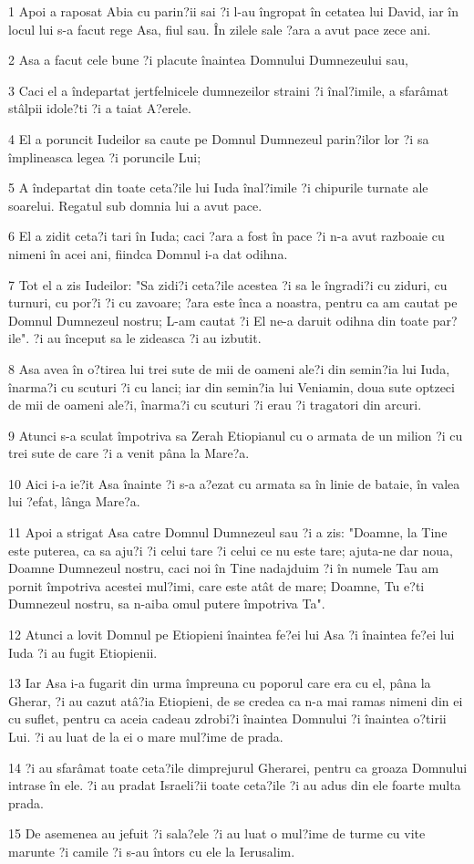 \par 1 Apoi a raposat Abia cu parin?ii sai ?i l-au îngropat în cetatea lui David, iar în locul lui s-a facut rege Asa, fiul sau. În zilele sale ?ara a avut pace zece ani.
\par 2 Asa a facut cele bune ?i placute înaintea Domnului Dumnezeului sau,
\par 3 Caci el a îndepartat jertfelnicele dumnezeilor straini ?i înal?imile, a sfarâmat stâlpii idole?ti ?i a taiat A?erele.
\par 4 El a poruncit Iudeilor sa caute pe Domnul Dumnezeul parin?ilor lor ?i sa împlineasca legea ?i poruncile Lui;
\par 5 A îndepartat din toate ceta?ile lui Iuda înal?imile ?i chipurile turnate ale soarelui. Regatul sub domnia lui a avut pace.
\par 6 El a zidit ceta?i tari în Iuda; caci ?ara a fost în pace ?i n-a avut razboaie cu nimeni în acei ani, fiindca Domnul i-a dat odihna.
\par 7 Tot el a zis Iudeilor: "Sa zidi?i ceta?ile acestea ?i sa le îngradi?i cu ziduri, cu turnuri, cu por?i ?i cu zavoare; ?ara este înca a noastra, pentru ca am cautat pe Domnul Dumnezeul nostru; L-am cautat ?i El ne-a daruit odihna din toate par?ile". ?i au început sa le zideasca ?i au izbutit.
\par 8 Asa avea în o?tirea lui trei sute de mii de oameni ale?i din semin?ia lui Iuda, înarma?i cu scuturi ?i cu lanci; iar din semin?ia lui Veniamin, doua sute optzeci de mii de oameni ale?i, înarma?i cu scuturi ?i erau ?i tragatori din arcuri.
\par 9 Atunci s-a sculat împotriva sa Zerah Etiopianul cu o armata de un milion ?i cu trei sute de care ?i a venit pâna la Mare?a.
\par 10 Aici i-a ie?it Asa înainte ?i s-a a?ezat cu armata sa în linie de bataie, în valea lui ?efat, lânga Mare?a.
\par 11 Apoi a strigat Asa catre Domnul Dumnezeul sau ?i a zis: "Doamne, la Tine este puterea, ca sa aju?i ?i celui tare ?i celui ce nu este tare; ajuta-ne dar noua, Doamne Dumnezeul nostru, caci noi în Tine nadajduim ?i în numele Tau am pornit împotriva acestei mul?imi, care este atât de mare; Doamne, Tu e?ti Dumnezeul nostru, sa n-aiba omul putere împotriva Ta".
\par 12 Atunci a lovit Domnul pe Etiopieni înaintea fe?ei lui Asa ?i înaintea fe?ei lui Iuda ?i au fugit Etiopienii.
\par 13 Iar Asa i-a fugarit din urma împreuna cu poporul care era cu el, pâna la Gherar, ?i au cazut atâ?ia Etiopieni, de se credea ca n-a mai ramas nimeni din ei cu suflet, pentru ca aceia cadeau zdrobi?i înaintea Domnului ?i înaintea o?tirii Lui. ?i au luat de la ei o mare mul?ime de prada.
\par 14 ?i au sfarâmat toate ceta?ile dimprejurul Gherarei, pentru ca groaza Domnului intrase în ele. ?i au pradat Israeli?ii toate ceta?ile ?i au adus din ele foarte multa prada.
\par 15 De asemenea au jefuit ?i sala?ele ?i au luat o mul?ime de turme cu vite marunte ?i camile ?i s-au întors cu ele la Ierusalim.

